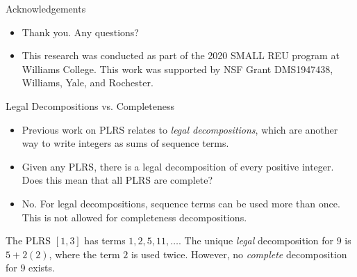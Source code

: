 \documentclass{beamer}
\begin{document}
\begin{frame}{Acknowledgements}
    \begin{itemize}
        \item Thank you. Any questions?
    
        \item This research was conducted as part of the 2020 SMALL REU program at Williams College. This work was supported by NSF Grant DMS1947438, Williams, Yale, and Rochester.
    \end{itemize}
\end{frame}

\begin{frame}{Legal Decompositions vs. Completeness}
    \begin{itemize}
        \item Previous work on PLRS relates to \emph{legal decompositions}, which are another way to write integers as sums of sequence terms.
        \item Given any PLRS, there is a legal decomposition of every positive integer. Does this mean that all PLRS are complete?
        \item No. For legal decompositions, sequence terms can be used more than once. This is not allowed for completeness decompositions.
    \end{itemize}
    
    
    \begin{example}
        The PLRS $[1,3]$ has terms $1, 2, 5, 11, \ldots$. The unique \emph{legal} decomposition for $9$ is $5 + 2(2)$, where the term $2$ is used twice. However, no \emph{complete} decomposition for $9$ exists.
    \end{example}
\end{frame}
\end{document}
